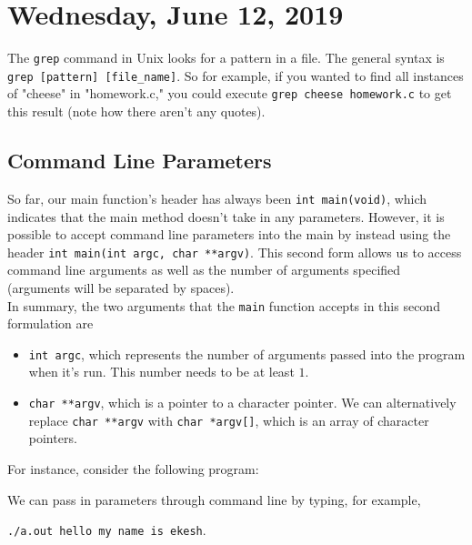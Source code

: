 \section{Wednesday, June 12, 2019}

The \verb!grep! command in Unix looks for a pattern in a file. The general syntax is \verb!grep [pattern] [file_name]!. So for example, if you wanted to find all instances of "cheese" in "homework.c," you could execute \verb!grep cheese homework.c! to get this result (note how there aren't any quotes). 

\subsection{Command Line Parameters}

So far, our main function's header has always been \texttt{int main(void)}, which indicates that the main method doesn't take in any parameters. However, it is possible to accept command line parameters into the main by instead using the header \texttt{int main(int argc, char **argv)}. This second form allows us to access command line arguments as well as the number of arguments specified (arguments will be separated by spaces). \\

In summary, the two arguments that the \texttt{main} function accepts in this second formulation are \begin{itemize}
    \item \texttt{int argc}, which represents the number of arguments passed into the program when it's run. This number needs to be at least $1$.
    \item \texttt{char **argv}, which is a pointer to a character pointer. We can alternatively replace \texttt{char **argv} with \texttt{char *argv[]}, which is an array of character pointers. 
\end{itemize}

For instance, consider the following program:


\lstset{
caption=Command Line Parameters
}
\begin{center}
\label{Command Line Parameters}
\end{center}


We can pass in parameters through command line by typing, for example, 
\begin{center}
\texttt{./a.out hello my name is ekesh}. 
\end{center}

